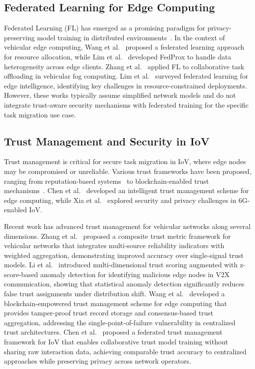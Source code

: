 \documentclass[journal,twoside]{IEEEtran}
\begin{document}
\subsection{Federated Learning for Edge Computing}

Federated Learning (FL) has emerged as a promising paradigm for privacy-preserving model training in distributed environments~\cite{mcmahan2017fedavg, kairouz2021advances}. In the context of vehicular edge computing, Wang et al.~\cite{wang2020federated} proposed a federated learning approach for resource allocation, while Lim et al.~\cite{lim2021federated} developed FedProx to handle data heterogeneity across edge clients. Zhang et al.~\cite{zhang2021federated} applied FL to collaborative task offloading in vehicular fog computing. Lim et al.~\cite{ref_fl_edge} surveyed federated learning for edge intelligence, identifying key challenges in resource-constrained deployments. However, these works typically assume simplified network models and do not integrate trust-aware security mechanisms with federated training for the specific task migration use case.

\subsection{Trust Management and Security in IoV}

Trust management is critical for secure task migration in IoV, where edge nodes may be compromised or unreliable. Various trust frameworks have been proposed, ranging from reputation-based systems~\cite{li2021trust} to blockchain-enabled trust mechanisms~\cite{zhang2020trust}. Chen et al.~\cite{chen2022intelligent} developed an intelligent trust management scheme for edge computing, while Xia et al.~\cite{xia2021security} explored security and privacy challenges in 6G-enabled IoV.

Recent work has advanced trust management for vehicular networks along several dimensions. Zhang et al.~\cite{zhang2023trust_composite} proposed a composite trust metric framework for vehicular networks that integrates multi-source reliability indicators with weighted aggregation, demonstrating improved accuracy over single-signal trust models. Li et al.~\cite{li2022trust_multidim} introduced multi-dimensional trust scoring augmented with z-score-based anomaly detection for identifying malicious edge nodes in V2X communication, showing that statistical anomaly detection significantly reduces false trust assignments under distribution shift. Wang et al.~\cite{wang2023trust_blockchain} developed a blockchain-empowered trust management scheme for edge computing that provides tamper-proof trust record storage and consensus-based trust aggregation, addressing the single-point-of-failure vulnerability in centralized trust architectures. Chen et al.~\cite{chen2024trust_federated} proposed a federated trust management framework for IoV that enables collaborative trust model training without sharing raw interaction data, achieving comparable trust accuracy to centralized approaches while preserving privacy across network operators.
\end{document}
